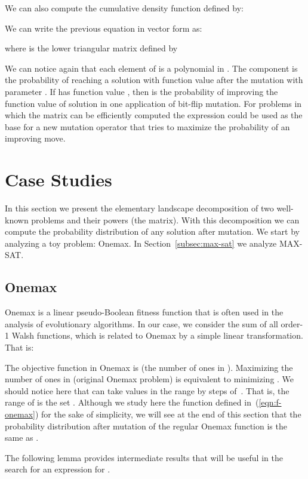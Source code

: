 \documentclass{article}
\begin{document}
We can also compute the cumulative density function  defined by:


We can write the previous equation in vector form as:

where  is the lower triangular matrix defined by 


We can notice again that each element of  is a polynomial in . The component  is the probability of reaching a solution  with function value  after the mutation with parameter . If  has function value , then  is the probability of improving the function value of solution  in one application of bit-flip mutation. For problems in which the matrix  can be efficiently computed the expression  could be used as the base for a new mutation operator that tries to maximize the probability of an improving move. 


\section{Case Studies}
\label{sec:study}

In this section we present the elementary landscape decomposition of two well-known problems and their powers (the  matrix). With this decomposition we can compute the probability distribution of any solution after mutation. We start by analyzing a toy problem: Onemax. In Section~\ref{subsec:max-sat} we analyze MAX-SAT.

\subsection{Onemax}
\label{subsec:onemax}

Onemax is a linear pseudo-Boolean fitness function that is often used in the analysis of evolutionary algorithms. In our case, we consider the sum of all order-1 Walsh functions, which is related to Onemax by a simple linear transformation. That is:


The objective function in Onemax is  (the number of ones in ).
Maximizing the number of ones in  (original Onemax problem) is equivalent to minimizing .
We should notice here that  can take values in the range  by steps of~. That is, the range of  is the set . Although we study here the function  defined in~(\ref{eqn:f-onemax}) for the sake of simplicity, we will see at the end of this section that the probability distribution after mutation of the regular Onemax function is the same as .

The following lemma provides intermediate results that will be useful in the search for an expression for  .
\end{document}
